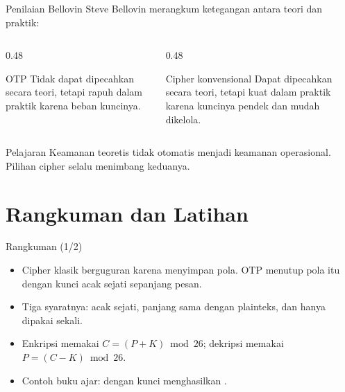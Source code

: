 \documentclass[aspectratio=169,11pt]{beamer}
\begin{document}
\begin{frame}{Penilaian Bellovin}
    \footnotesize
    Steve Bellovin merangkum ketegangan antara teori dan praktik:
    \begin{columns}[T,onlytextwidth]
        \begin{column}{0.48\textwidth}
            \begin{block}{OTP}
                Tidak dapat dipecahkan secara teori, tetapi rapuh dalam
                praktik karena beban kuncinya.
            \end{block}
        \end{column}
        \begin{column}{0.48\textwidth}
            \begin{block}{Cipher konvensional}
                Dapat dipecahkan secara teori, tetapi kuat dalam praktik
                karena kuncinya pendek dan mudah dikelola.
            \end{block}
        \end{column}
    \end{columns}
    \vspace{0.2cm}
    \begin{exampleblock}{Pelajaran}
        Keamanan teoretis tidak otomatis menjadi keamanan operasional.
        Pilihan cipher selalu menimbang keduanya.
    \end{exampleblock}
\end{frame}

\section{Rangkuman dan Latihan}

\begin{frame}{Rangkuman (1/2)}
    \footnotesize
    \begin{itemize}
        \item Cipher klasik berguguran karena menyimpan pola. OTP menutup
              pola itu dengan kunci acak sejati sepanjang pesan.
        \item Tiga syaratnya: acak sejati, panjang sama dengan plainteks,
              dan hanya dipakai sekali.
        \item Enkripsi memakai $C=(P+K)\bmod 26$; dekripsi memakai
              $P=(C-K)\bmod 26$.
        \item Contoh buku ajar:  dengan kunci
               menghasilkan .
    \end{itemize}
\end{frame}
\end{document}
